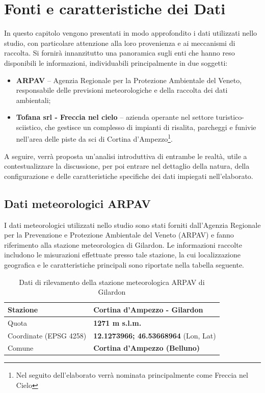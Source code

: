 \cleardoublepage
\chapter{Fonti e caratteristiche dei Dati}
\label{cha:data_prop}

In questo capitolo vengono presentati in modo approfondito i dati utilizzati nello studio, con particolare attenzione alla loro provenienza e ai meccanismi di raccolta. 
Si fornirà innanzitutto una panoramica sugli enti che hanno reso disponibili le informazioni, individuabili principalmente in due soggetti:
\begin{itemize}
    \item \textbf{ARPAV} – Agenzia Regionale per la Protezione Ambientale del Veneto, responsabile delle previsioni meteorologiche e della raccolta dei dati ambientali;
    \item \textbf{Tofana srl - Freccia nel cielo} – azienda operante nel settore turistico-sciistico, che gestisce un complesso di impianti di risalita, parcheggi e funivie nell’area delle piste da sci di Cortina d’Ampezzo\footnote{Nel seguito dell'elaborato verrà  nominata principalmente come Freccia nel Cielo}.
\end{itemize}

A seguire, verrà proposta un’analisi introduttiva di entrambe le realtà, utile a contestualizzare la discussione, per poi entrare nel dettaglio della natura, della configurazione e delle caratteristiche specifiche dei dati impiegati nell’elaborato.

\section{Dati meteorologici ARPAV}
I dati meteorologici utilizzati nello studio sono stati forniti dall’Agenzia Regionale per la Prevenzione e Protezione Ambientale del Veneto (ARPAV) e fanno riferimento alla stazione meteorologica di Gilardon. 
Le informazioni raccolte includono le misurazioni effettuate presso tale stazione, la cui localizzazione geografica e le caratteristiche principali sono riportate nella tabella seguente.

\begin{table}[h]
    \centering
    \begin{tabular}{|l|l|}
    \hline
      Stazione   &  \textbf{Cortina d'Ampezzo - Gilardon} \\ \hline
        Quota & \textbf{1271 m s.l.m.} \\ \hline
        Coordinate (EPSG 4258) & \textbf{12.1273966; 46.53668964} (Lon, Lat) \\ \hline
        Comune & \textbf{Cortina d'Ampezzo (Belluno)} \\ \hline
    \end{tabular}
    \caption{Dati di rilevamento della stazione meteorologica ARPAV di Gilardon}
    \label{tab:rilevamento_dati}
\end{table}

